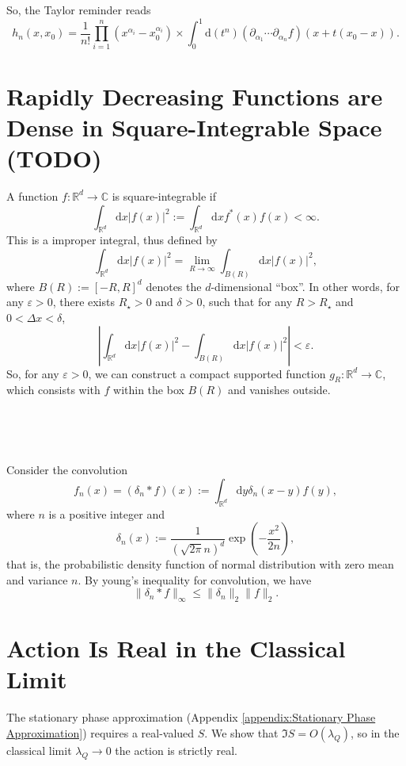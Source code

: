 \documentclass{book}
\newcommand{\assign}{:=}
\newcommand{\mathd}{\mathrm{d}}
\newcommand{\mathpi}{\pi}
\begin{document}
So, the Taylor reminder reads
\begin{equation}
  h_n (x, x_0) = \frac{1}{n!}  \prod_{i = 1}^n (x^{\alpha_i} - x_0^{\alpha_i})
  \times \int_0^1 \mathd (t^n)  (\partial_{\alpha_1} \cdots
  \partial_{\alpha_n} f)  (x + t (x_0 - x)) .
\end{equation}
\chapter{Rapidly Decreasing Functions are Dense in Square-Integrable Space
(TODO)}\label{appendix:dense}

A function $f : \mathbb{R}^d \rightarrow \mathbb{C}$ is square-integrable if
\[ \int_{\mathbb{R}^d} \mathd x |f (x) |^2 \assign \int_{\mathbb{R}^d} \mathd
   xf^{\ast} (x) f (x) < \infty . \]
This is a improper integral, thus defined by
\[ \int_{\mathbb{R}^d} \mathd x |f (x) |^2 = \lim_{R \rightarrow \infty} 
   \int_{B (R)} \mathd x |f (x) |^2, \]
where $B (R) \assign [- R, R]^d$ denotes the $d$-dimensional ``box''. In other
words, for any $\varepsilon > 0$, there exists $R_{\star} > 0$ and $\delta >
0$, such that for any $R > R_{\star}$ and $0 < \Delta x < \delta$,
\[ \left| \int_{\mathbb{R}^d} \mathd x|f (x) |^2 - \int_{B (R)} \mathd x|f (x)
   |^2 \right| < \varepsilon . \]
So, for any $\varepsilon > 0$, we can construct a compact supported function
$g_R : \mathbb{R}^d \rightarrow \mathbb{C}$, which consists with $f$ within
the box $B (R)$ and vanishes outside.

\

\hrulefill

\

Consider the convolution
\[ f_n (x) = (\delta_n \ast f) (x) \assign \int_{\mathbb{R}^d} \mathd y
   \delta_n  (x - y) f (y), \]
where $n$ is a positive integer and
\[ \delta_n (x) \assign \frac{1}{\left( \sqrt{2 \mathpi} n \right)^d} \exp
   \left( - \frac{x^2}{2 n} \right), \]
that is, the probabilistic density function of normal distribution with zero
mean and variance $n$. By young's inequality for convolution, we have
\[ \| \delta_n \ast f\|_{\infty} \leqslant \| \delta_n \|_2 \|f\|_2 . \]

\chapter{Action Is Real in the Classical
Limit}\label{appendix:real-action-cl}

The stationary phase approximation (Appendix
\ref{appendix:Stationary Phase Approximation}) requires a real-valued
$S$. We show that $\Im S = O (\lambda_Q)$, so in the classical limit
$\lambda_Q \to 0$ the action is strictly real.
\end{document}
